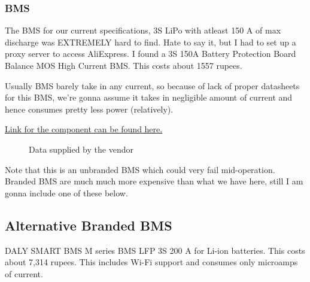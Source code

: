 \documentclass[12pt]{article}
\begin{document}
\subsubsection*{BMS}
The BMS for our current specifications, 3S LiPo with atleast 150 A of max discharge was EXTREMELY hard to find. Hate to say it, but I had to set up a proxy server to access AliExpress. I found a 3S 150A Battery Protection Board Balance MOS High Current BMS. 
This costs about 1557 rupees.

Usually BMS barely take in any current, so because of lack of proper datasheets for this BMS, we're gonna assume it takes in negligible amount of current and hence consumes pretty less power (relatively).

\href{https://www.aliexpress.com/item/1005003684963240.html}{Link for the component can be found here.}

\begin{figure}[!ht]
    \centering
    \caption{Data supplied by the vendor}\label{fig:}
\end{figure}
\FloatBarrier

Note that this is an unbranded BMS which could very fail mid-operation. Branded BMS are much much more expensive than what we have here, still I am gonna include one of these below.

\subsection*{Alternative Branded BMS}
DALY SMART BMS M series BMS LFP 3S 200 A for Li-ion batteries. This costs about 7,314 rupees. This includes Wi-Fi support and consumes only microamps of current.
\end{document}
